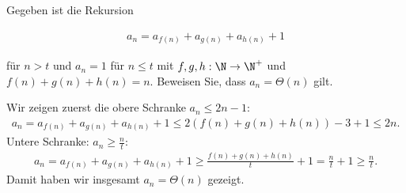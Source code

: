 
\begin{exercise}

Gegeben ist die Rekursion

\begin{align*}
  a_n = a_{f(n)} + a_{g(n)} + a_{h(n)} + 1
\end{align*}

für $n > t$ und $a_n = 1$ für $n \leq t$ mit $f,g,h: \N \rightarrow \N^+$ und $f(n) + g(n) + h(n) = n$. Beweisen Sie, dass $a_n = \Theta(n)$ gilt.
\end{exercise}


\begin{solution}
Wir zeigen zuerst die obere Schranke $a_n \leq 2n - 1$:
\begin{align*}
  a_n = a_{f(n)} + a_{g(n)} + a_{h(n)} + 1 \leq 2(f(n) + g(n) + h(n)) - 3 + 1 \leq 2n.
\end{align*}
Untere Schranke: $a_n \geq \frac{n}{t}$:
\begin{align*}
  a_n = a_{f(n)} + a_{g(n)} + a_{h(n)} + 1 \geq \frac{f(n) + g(n) + h(n)}{t} + 1 = \frac{n}{t} + 1 \geq \frac{n}{t}.
\end{align*}
Damit haben wir insgesamt $a_n = \Theta(n)$ gezeigt.
\end{solution}

